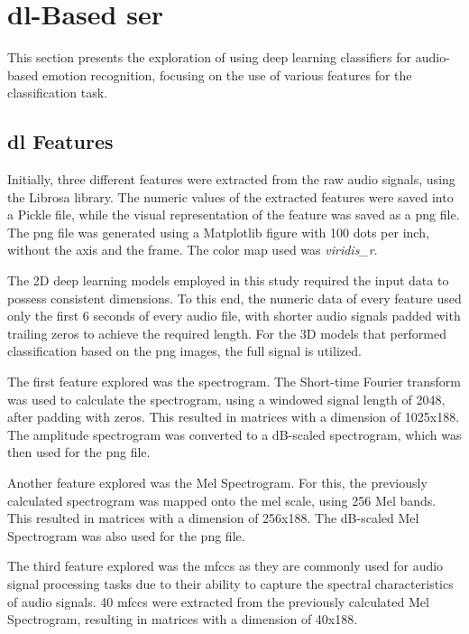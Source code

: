 \section{\acl{dl}-Based \ac{ser}}

This section presents the exploration of using deep learning classifiers for audio-based emotion recognition, focusing on the use of various features for the classification task.

\subsection{\acl{dl} Features}

Initially, three different features were extracted from the raw audio signals, using the Librosa library. The numeric values of the extracted features were saved into a Pickle file, while the visual representation of the feature was saved as a \ac{png} file. The \ac{png} file was generated using a Matplotlib figure with 100 dots per inch, without the axis and the frame. The color map used was \textit{viridis\_r}.

The 2D deep learning models employed in this study required the input data to possess consistent dimensions. To this end, the numeric data of every feature used only the first 6 seconds of every audio file, with shorter audio signals padded with trailing zeros to achieve the required length. For the 3D models that performed classification based on the \ac{png} images, the full signal is utilized.

The first feature explored was the spectrogram. The Short-time Fourier transform was used to calculate the spectrogram, using a windowed signal length of 2048, after padding with zeros. This resulted in matrices with a dimension of 1025x188. The amplitude spectrogram was converted to a dB-scaled spectrogram, which was then used for the \ac{png} file.

Another feature explored was the Mel Spectrogram. For this, the previously calculated spectrogram was mapped onto the mel scale, using 256 Mel bands. This resulted in matrices with a dimension of 256x188. The dB-scaled Mel Spectrogram was also used for the \ac{png} file.

The third feature explored was the \ac{mfccs} as they are commonly used for audio signal processing tasks due to their ability to capture the spectral characteristics of audio signals. 40 \ac{mfccs} were extracted from the previously calculated Mel Spectrogram, resulting in matrices with a dimension of 40x188.

